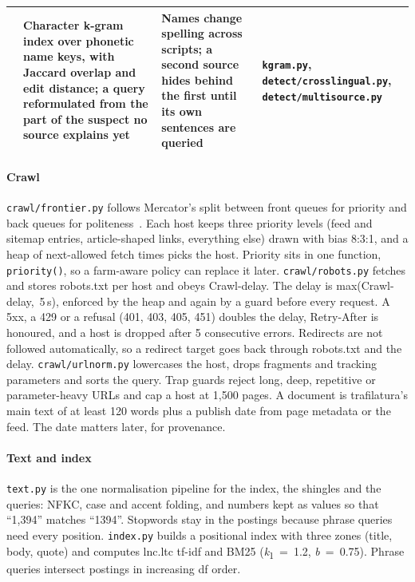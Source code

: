\documentclass[11pt,a4paper]{article}
\newcommand{\code}[1]{\texttt{#1}}
\begin{document}
\begin{table}[t]
\begin{tabularx}{\textwidth}{@{}P{2.5cm}P{5.4cm}LP{3.2cm}@{}}
     & Character k-gram index over phonetic name keys, with Jaccard overlap and edit distance; a query reformulated from the part of the suspect no source explains yet & Names change spelling across scripts; a second source hides behind the first until its own sentences are queried & \code{kgram.py}, \code{detect/crosslingual.py}, \code{detect/multisource.py} \\
    \bottomrule
  \end{tabularx}
\end{table}

\paragraph{Crawl} \code{crawl/frontier.py} follows Mercator's split between front queues for priority and back queues for politeness~\cite{heydon1999}. Each host keeps three priority levels (feed and sitemap entries, article-shaped links, everything else) drawn with bias 8:3:1, and a heap of next-allowed fetch times picks the host. Priority sits in one function, \code{priority()}, so a farm-aware policy can replace it later. \code{crawl/robots.py} fetches and stores robots.txt per host and obeys Crawl-delay. The delay is max(Crawl-delay,~5\,s), enforced by the heap and again by a guard before every request. A 5xx, a 429 or a refusal (401, 403, 405, 451) doubles the delay, Retry-After is honoured, and a host is dropped after 5 consecutive errors. Redirects are not followed automatically, so a redirect target goes back through robots.txt and the delay. \code{crawl/urlnorm.py} lowercases the host, drops fragments and tracking parameters and sorts the query. Trap guards reject long, deep, repetitive or parameter-heavy URLs and cap a host at 1,500 pages. A document is trafilatura's main text of at least 120 words plus a publish date from page metadata or the feed. The date matters later, for provenance.

\paragraph{Text and index} \code{text.py} is the one normalisation pipeline for the index, the shingles and the queries: NFKC, case and accent folding, and numbers kept as values so that ``1,394'' matches ``1394''. Stopwords stay in the postings because phrase queries need every position. \code{index.py} builds a positional index with three zones (title, body, quote) and computes lnc.ltc tf-idf and BM25 (\textit{k}\textsubscript{1}~=~1.2, \textit{b}~=~0.75). Phrase queries intersect postings in increasing df order.
\end{document}
